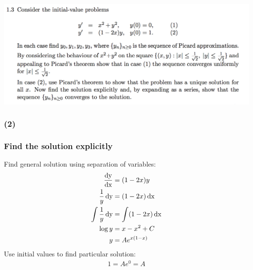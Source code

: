 \documentclass[12pt]{article}
\begin{document}
\newpage
\begin{mdframed}
\includegraphics[width=400pt]{img/differential-equations-a1-1-3.png}\\
\end{mdframed}
\subsubsection*{(2)}

\subsubsection*{Find the solution explicitly}
Find general solution using separation of variables:
\begin{align*}
  \frac{\operatorname{\text{dy}}}{\operatorname{\text{dx}}} &= (1 - 2x)y\\
  \frac{1}{y}\operatorname{\text{dy}} &= (1 - 2x) \operatorname{\text{dx}}\\
  \int \frac{1}{y} \operatorname{\text{dy}} &= \int (1 - 2x) \operatorname{\text{dx}}\\
               \log y  &= x - x^2 + C\\
       y &= Ae^{x(1-x)}
\end{align*}
Use initial values to find particular solution:
\begin{align*}
  1 = Ae^0 = A
\end{align*}
\end{document}

